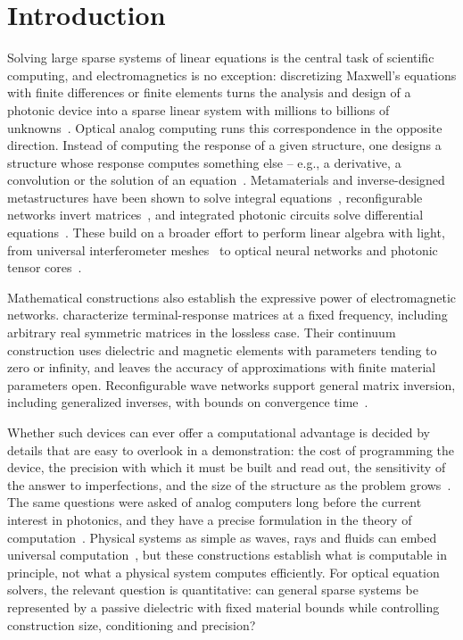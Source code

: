\section{Introduction}

Solving large sparse systems of linear equations is the central task of
scientific computing, and electromagnetics is no exception: discretizing
Maxwell's equations with finite differences or finite elements turns the
analysis and design of a photonic device into a sparse linear system with
millions to billions of unknowns~\citep{yee1966,Oskooi2010,ShinFan2012}.
Optical analog computing runs this correspondence in the opposite direction.
Instead of computing the response of a given structure, one designs a structure
whose response computes something else -- e.g., a derivative, a convolution or
the solution of an equation~\citep{Silva2014,ZangenehNejad2021,McMahon2023}.
Metamaterials and inverse-designed metastructures have been shown to solve
integral equations~\citep{estakhri2019,Camacho2021,cordaro2023}, reconfigurable
networks invert matrices~\citep{tzarouchis2022,chen2024}, and integrated
photonic circuits solve differential equations~\citep{yang2014,ye2024}. These
build on a broader effort to perform linear algebra with light, from universal
interferometer meshes~\citep{reck1994,Miller2013SelfConfiguring,Carolan2015,Clements2016,Bogaerts2020}
to optical neural networks and photonic tensor
cores~\citep{Shen2017,Lin2018,Feldmann2021,Wetzstein2020,Shastri2021,Wright2022}.

Mathematical constructions also establish the expressive power of
electromagnetic networks. \citet{MiltonSeppecher2010} characterize
terminal-response matrices at a fixed frequency, including arbitrary real
symmetric matrices in the lossless case. Their continuum construction uses
dielectric and magnetic elements with parameters tending to zero or infinity,
and leaves the accuracy of approximations with finite material parameters
open. Reconfigurable wave networks support general matrix inversion,
including generalized inverses, with bounds on convergence
time~\citep{tzarouchis2022}.

Whether such devices can ever offer a computational advantage is decided by
details that are easy to overlook in a demonstration: the cost of programming
the device, the precision with which it must be built and read out, the
sensitivity of the answer to imperfections, and the size of the structure as
the problem grows~\citep{Aaronson2015FinePrint,McMahon2023}. The same questions
were asked of analog computers long before the current interest in photonics,
and they have a precise formulation in the theory of
computation~\citep{Shannon1941,Vergis1986,BSS1989,SiegelmannSontag1994,BournezPouly2021}.
Physical systems as simple as waves, rays and fluids can embed universal
computation~\citep{PourElRichards1981,Moore1990,ReifTygarYoshida1994,Cubitt2015,Tao2016,Cardona2021},
but these constructions establish what is computable in principle, not what a
physical system computes efficiently. For optical equation solvers, the
relevant question is quantitative: can general sparse systems be represented
by a passive dielectric with fixed material bounds while controlling
construction size, conditioning and precision?

